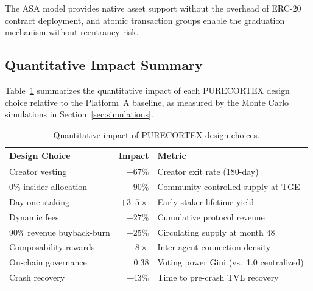 The ASA model provides native asset support without the overhead of ERC-20
contract deployment, and atomic transaction groups enable the graduation
mechanism without reentrancy risk.

\subsection{Quantitative Impact Summary}
\label{subsec:quant-impact}

Table~\ref{tab:impact-summary} summarizes the quantitative impact of each
PURECORTEX design choice relative to the Platform~A baseline, as measured by
the Monte Carlo simulations in Section~\ref{sec:simulations}.

\begin{table}[H]
\centering
\caption{Quantitative impact of PURECORTEX design choices.}
\label{tab:impact-summary}
\begin{tabular}{@{}lrl@{}}
\toprule
\textbf{Design Choice} & \textbf{Impact} & \textbf{Metric} \\
\midrule
Creator vesting & $-67\%$ & Creator exit rate (180-day) \\
0\% insider allocation & $90\%$ & Community-controlled supply at TGE \\
Day-one staking & $+3\text{--}5\times$ & Early staker lifetime yield \\
Dynamic fees & $+27\%$ & Cumulative protocol revenue \\
90\% revenue buyback-burn & $-25\%$ & Circulating supply at month 48 \\
Composability rewards & $+8\times$ & Inter-agent connection density \\
On-chain governance & $0.38$ & Voting power Gini (vs.\ 1.0 centralized) \\
Crash recovery & $-43\%$ & Time to pre-crash TVL recovery \\
\bottomrule
\end{tabular}
\end{table}
